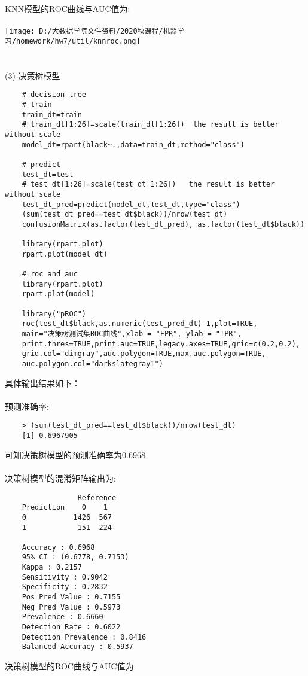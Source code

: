 \documentclass[]{article}
\begin{document}
KNN模型的ROC曲线与AUC值为:\\\\
\texttt{[image: D:/大数据学院文件资料/2020秋课程/机器学习/homework/hw7/util/knnroc.png]}\\\\\\
(3) 决策树模型
\begin{lstlisting}
	# decision tree
	# train
	train_dt=train 
	# train_dt[1:26]=scale(train_dt[1:26])  the result is better without scale
	model_dt=rpart(black~.,data=train_dt,method="class")
	
	# predict
	test_dt=test
	# test_dt[1:26]=scale(test_dt[1:26])   the result is better without scale
	test_dt_pred=predict(model_dt,test_dt,type="class")
	(sum(test_dt_pred==test_dt$black))/nrow(test_dt)
	confusionMatrix(as.factor(test_dt_pred), as.factor(test_dt$black))
	
	library(rpart.plot)
	rpart.plot(model_dt)
	
	# roc and auc
	library(rpart.plot)
	rpart.plot(model)
	
	library("pROC")
	roc(test_dt$black,as.numeric(test_pred_dt)-1,plot=TRUE,
	main="决策树测试集ROC曲线",xlab = "FPR", ylab = "TPR",
	print.thres=TRUE,print.auc=TRUE,legacy.axes=TRUE,grid=c(0.2,0.2),
	grid.col="dimgray",auc.polygon=TRUE,max.auc.polygon=TRUE,
	auc.polygon.col="darkslategray1")
\end{lstlisting} 
具体输出结果如下：\\\\
预测准确率:
\begin{lstlisting}
	> (sum(test_dt_pred==test_dt$black))/nrow(test_dt)
	[1] 0.6967905
\end{lstlisting}
可知决策树模型的预测准确率为0.6968\\\\
决策树模型的混淆矩阵输出为:
\begin{lstlisting}
	             Reference
	Prediction    0    1
	0           1426  567
	1            151  224
	
	Accuracy : 0.6968          
	95% CI : (0.6778, 0.7153)
	Kappa : 0.2157          
	Sensitivity : 0.9042          
	Specificity : 0.2832          
	Pos Pred Value : 0.7155          
	Neg Pred Value : 0.5973          
	Prevalence : 0.6660          
	Detection Rate : 0.6022          
	Detection Prevalence : 0.8416          
	Balanced Accuracy : 0.5937          
\end{lstlisting}
决策树模型的ROC曲线与AUC值为:\\\\
\end{document}
